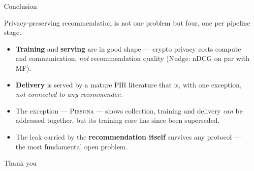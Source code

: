 \documentclass[10pt,aspectratio=169]{beamer}
\newcommand{\sys}[1]{\textsc{#1}\xspace}
\begin{document}
\begin{frame}{Conclusion}
  \begin{center}\large
  Privacy-preserving recommendation is \alert{not one problem but four}, one per pipeline stage.
  \end{center}
 
  \vspace{0.4em}
  \begin{itemize}
    \item \textbf{Training} and \textbf{serving} are in good shape --- crypto privacy costs
          compute and communication, \emph{not} recommendation quality (Nudge: nDCG on par with MF).
    \item \textbf{Delivery} is served by a mature PIR literature that is, with one
          exception, \emph{not connected to any recommender}.
    \item The exception --- \sys{Pirsona} --- shows collection, training and delivery
          \emph{can} be addressed together, but its training core has since been superseded.
    \item The leak carried by the \textbf{recommendation itself} survives any protocol ---
          the most fundamental open problem.
  \end{itemize}
\end{frame}
 
\begin{frame}[standout]
  Thank you\\[0.3em]
\end{frame}
 
\end{document}
